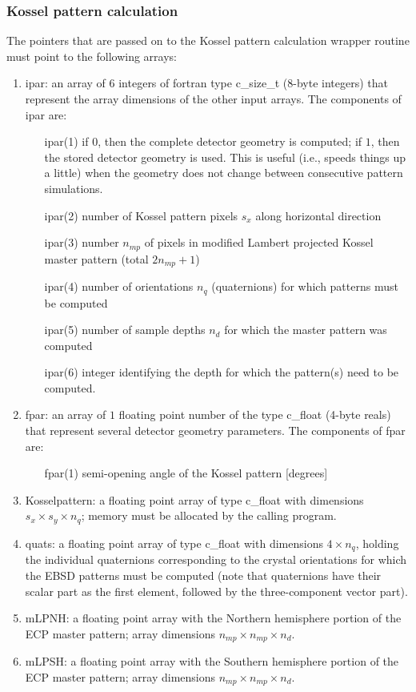 \documentclass[DIV=calc, paper=letter, fontsize=11pt]{scrartcl}	 %
\begin{document}
\subsubsection{Kossel pattern calculation}
The pointers that are passed on to the Kossel pattern calculation wrapper routine must point to the following arrays:
\begin{enumerate}
	\item \textsf{ipar}: an array of $6$ integers of fortran type \textsf{c\_size\_t} ($8$-byte integers) that represent the array dimensions
	of the other input arrays.  The components of \textsf{ipar} are:
		\begin{enumerate}
			\item[\textsf{ipar}(1)] if $0$, then the complete detector geometry is computed; if $1$, then the stored detector geometry is used.  This is useful (i.e., speeds things up a little)
			when the geometry does not change between consecutive pattern simulations.
			\item[\textsf{ipar}(2)] number of Kossel pattern pixels $s_x$ along horizontal direction
\			\item[\textsf{ipar}(3)] number $n_{mp}$ of pixels in modified Lambert projected Kossel master pattern (total $2n_{mp}+1$)
			\item[\textsf{ipar}(4)] number of orientations $n_q$ (quaternions) for which patterns must be computed
			\item[\textsf{ipar}(5)] number of sample depths $n_d$ for which the master pattern was computed
			\item[\textsf{ipar}(6)] integer identifying the depth for which the pattern(s) need to be computed.
		\end{enumerate}
	\item \textsf{fpar}: an array of $1$ floating point number of the type \textsf{c\_float} (4-byte reals) that represent several detector geometry parameters. The 
	components of \textsf{fpar} are:
	\begin{enumerate}
		\item[\textsf{fpar}(1)] semi-opening angle of the Kossel pattern [degrees]
	\end{enumerate}
	\item \textsf{Kosselpattern}: a floating point array of type \textsf{c\_float} with dimensions $s_x\times s_y\times n_q$; memory must be allocated by the calling program.
	\item \textsf{quats}: a floating point array of type \textsf{c\_float} with dimensions $4\times n_q$, holding the individual quaternions corresponding to the crystal
	orientations for which the EBSD patterns must be computed (note that quaternions have their scalar part as the first element, followed by the three-component vector part).
	\item \textsf{mLPNH}: a floating point array with the Northern hemisphere portion of the ECP master pattern; array dimensions $n_{mp}\times n_{mp}\times n_{d}$.
	\item \textsf{mLPSH}: a floating point array with the Southern hemisphere portion of the ECP master pattern; array dimensions $n_{mp}\times n_{mp}\times n_{d}$.
\end{enumerate}
\end{document}
